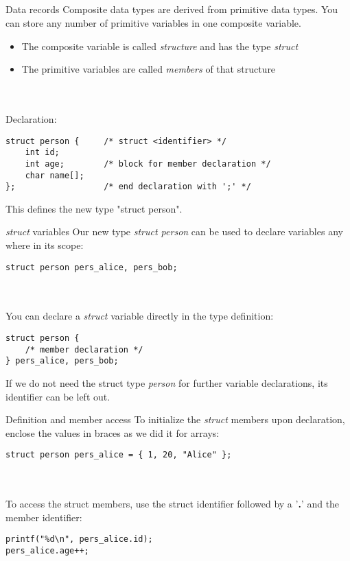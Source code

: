 \subsection{}
\begin{frame}[fragile]{Data records}
	Composite data types are derived from primitive data types. You can store any number of primitive variables in one composite variable.
	\begin{itemize}
		\item The composite variable is called \textit{structure} and has the type \textit{struct}
		\item The primitive variables are called \textit{members} of that structure
	\end{itemize} \ \\ \ \\
	Declaration:
	\begin{lstlisting}[numbers=none]
struct person {		/* struct <identifier> */
	int id;
	int age;		/* block for member declaration */
	char name[];
};					/* end declaration with ';' */
\end{lstlisting}
	This defines the new type "struct person".
\end{frame}
\begin{frame}[fragile]{\textit{struct} variables}
	Our new type \textit{struct person} can be used to declare variables any where in its scope:
	\begin{lstlisting}[numbers=none]
struct person pers_alice, pers_bob;
\end{lstlisting} \ \\ \ \\
	You can declare a \textit{struct} variable directly in the type definition:
	\begin{lstlisting}[numbers=none]
struct person {
	/* member declaration */
} pers_alice, pers_bob;
\end{lstlisting}
	If we do not need the struct type \textit{person} for further variable declarations, its identifier can be left out.
\end{frame}
\begin{frame}[fragile]{Definition and member access}
	To initialize the \textit{struct} members upon declaration, enclose the values in braces as we did it for arrays:
	\begin{lstlisting}[numbers=none]
struct person pers_alice = { 1, 20, "Alice" };
\end{lstlisting} \ \\ \ \\
	To access the struct members, use the struct identifier followed by a '\textbf{.}' and the member identifier:
	\begin{lstlisting}[numbers=none]
printf("%d\n", pers_alice.id);
pers_alice.age++;
\end{lstlisting}
\end{frame}
